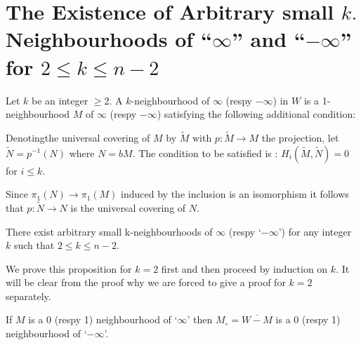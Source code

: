 \section[The Existence of Arbitrary small...]{The Existence of Arbitrary small $k.$ Neighbourhoods of
  ``$\infty$'' and ``$-\infty$'' for $2 \leq k \leq n - 2$}\label{chap2:sec3}%

\begin{definition}%
Let $k$ be an integer $\geq 2$. A $k$-neighbourhood of $\infty$ (respy
$-\infty$) in $W$ is a 1-neighbourhood $M$ of $\infty$
(respy $-\infty$) satisfying the following additional condition: 

Denoting\pageoriginale the universal covering of $M$ by $\tilde{M}$
with $p : \tilde{M} \to M$ the projection, let $\tilde{N} = p^{-1}
(N)$ where $N = bM$. The condition to be satisfied is : $H_i
(\tilde{M}, \tilde N) = 0$ for $i \leq k$.  
\end{definition}

\begin{remark*}
Since $\pi_1 (N)\to \pi_1(M)$ induced by the inclusion is an
isomorphism it follows that $p : \tilde{N} \to N$ is the universal
covering of $N$. 
\end{remark*}

\setcounter{prop}{1}
\begin{prop}\label{chap2:prop3.2}%
There exist arbitrary small k-neighbourhoods of $\infty$
(respy `$-\infty$') for any integer $k$ such that $2 \leq k \leq n -
2$. 
\end{prop}

We prove this proposition for $k = 2$ first and then proceed by
induction on $k$. It will be clear from the proof why we are forced to
give a proof for $k = 2$ separately. 

\setcounter{lemma}{2}
\begin{lemma}\label{chap2:lem3.3}%
If $M$ is a 0 (respy 1) neighbourhood of `$\infty$' then $M_\circ =
\overline{W - M}$ is a 0 (respy 1) neighbourhood of `$-\infty$'. 
\end{lemma}

